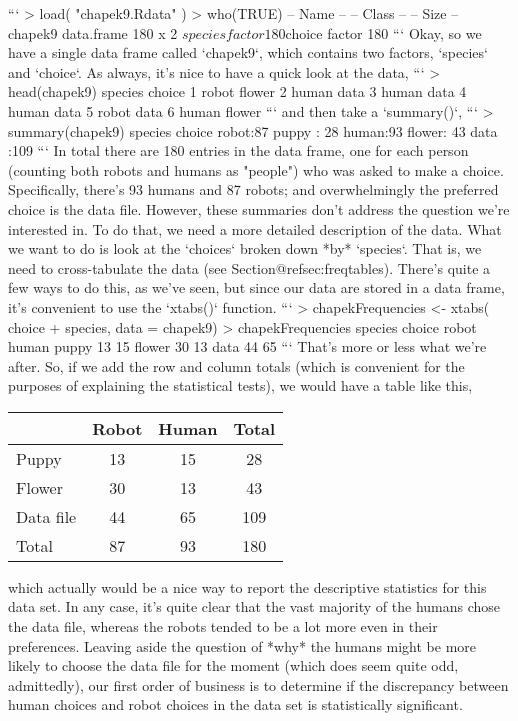 ```
> load( "chapek9.Rdata" )
> who(TRUE)
   -- Name --   -- Class --   -- Size --
   chapek9      data.frame    180 x 2   
    $species    factor        180       
    $choice     factor        180            
```
Okay, so we have a single data frame called `chapek9`, which contains two factors, `species` and `choice`. As always, it's nice to have a quick look at the data,
```     
> head(chapek9)
  species choice
1   robot flower
2   human   data
3   human   data
4   human   data
5   robot   data
6   human flower
```
and then take a `summary()`,
```
> summary(chapek9)
  species      choice   
 robot:87   puppy : 28  
 human:93   flower: 43  
            data  :109  
```
In total there are 180 entries in the data frame, one for each person (counting both robots and humans as "people") who was asked to make a choice. Specifically, there's 93 humans and 87 robots; and overwhelmingly the preferred choice is the data file. However, these summaries don't address the question we're interested in. To do that, we need a more detailed description of the data. What we want to do is look at the `choices` broken down *by* `species`. That is, we need to cross-tabulate the data (see Section@refsec:freqtables). There's quite a few ways to do this, as we've seen, but since our data are stored in a data frame, it's convenient to use the `xtabs()` function. 
```
> chapekFrequencies <- xtabs( ~ choice + species, data = chapek9)
> chapekFrequencies
        species
choice   robot human
  puppy     13    15
  flower    30    13
  data      44    65
```
That's more or less what we're after. So, if we add the row and column totals (which is convenient for the purposes of explaining the statistical tests), we would have a table like this,
\begin{center}
\begin{tabular}{l|cc|c}
          & Robot & Human & Total \\ \hline
Puppy     & 13  & 15 & 28 \\
Flower    & 30  & 13 & 43 \\
Data file & 44  & 65 & 109 \\ \hline
Total     & 87 & 93 & 180
\end{tabular}
\end{center}
which actually would be a nice way to report the descriptive statistics for this data set. In any case, it's quite clear that the vast majority of the humans chose the data file, whereas the robots tended to be a lot  more even in their preferences. Leaving aside the question of *why* the humans might be more likely to choose the data file for the moment (which does seem quite odd, admittedly), our first order of business is to determine if the discrepancy between human choices and robot choices in the data set is statistically significant.




